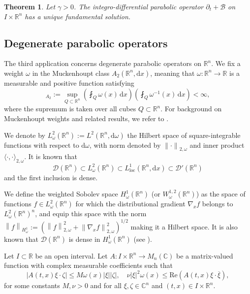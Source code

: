 \documentclass[11pt, letterpaper]{amsart}
\newtheorem{thm}{Theorem}[section]
\theoremstyle{definition}
\theoremstyle{remark}
\numberwithin{equation}{section}
\begin{document}
\begin{thm} Let $\gamma>0$.  
    The integro-differential parabolic  operator $\partial_t+ \mathcal{B}$ on $I\times \mathbb{R}^n$  has a unique fundamental solution.
\end{thm}


\subsection{Degenerate parabolic operators}
The third application concerns degenerate parabolic operators on $\mathbb{R}^n$. We fix a weight $\omega$ in the Muckenhoupt class $A_2(\mathbb{R}^n, \mathrm{d}x)$, meaning that $\omega: \mathbb{R}^n \to \mathbb{R}$ is a measurable and positive function satisfying
\begin{equation*}
     [ \omega  ]_{A_2}:= \sup_{Q \subset \mathbb{R}^n  } \left ( \fint_Q\omega(x)\,\mathrm{d} x   \right ) \left ( \fint_Q\omega^{-1}(x)\,\mathrm{d} x   \right ) < \infty,
\end{equation*}
where the supremum is taken over all cubes $Q \subset \mathbb{R}^n$. For background on Muckenhoupt weights and related results, we refer to \cite[Ch. V]{Stein1993_HA}.

We denote by $L^2_\omega(\mathbb{R}^n) := L^2(\mathbb{R}^n, \mathrm{d}\omega)$ the Hilbert space of square-integrable functions with respect to $\mathrm{d}\omega$, with norm denoted by ${\lVert \cdot \rVert}_{2,\omega}$ and inner product $\langle \cdot , \cdot \rangle_{2,\omega}$. It is known that $$\mathcal{D}(\mathbb{R}^n)  
\subset L^2_\omega(\mathbb{R}^n) \subset L^1_{\text{loc}}(\mathbb{R}^n, \mathrm{d}x) \subset \mathcal{D}'(\mathbb{R}^n)$$ and the first inclusion is dense.

We define the weighted Sobolev space $H^1_{\omega}(\mathbb{R}^n)$ (or $W^{1,2}_\omega(\mathbb{R}^n)$) as the space of functions $f \in L^2_\omega(\mathbb{R}^n)$ for which the distributional gradient $\nabla_x f$ belongs to $L^2_\omega(\mathbb{R}^n)^n$, and equip this space with the norm $\left\| f \right\|_{H^1_\omega} := ( \left\| f \right\|_{2,\omega}^2 + \left\| \nabla_x f \right\|_{2,\omega}^2 )^{1/2}$ making it a Hilbert space. It is also known that  $\mathcal{D}(\mathbb{R}^n)$ is dense in $H^1_{\omega}(\mathbb{R}^n)$ (see \cite[Thm. 2.5]{kilpelainen1994weighted}).

Let $I \subset \mathbb{R}$ be an open interval. Let $A: I \times \mathbb{R}^n \to M_n(\mathbb{C})$ be a matrix-valued function with complex measurable coefficients such that
$$
\left| A(t,x) \xi \cdot \zeta \right| \leq M \omega(x) \left| \xi \right| \left| \zeta \right|, \quad \nu \left| \xi \right|^2 \omega(x) \leq \mathrm{Re}(A(t,x) \xi \cdot \overline{\xi}),
$$
for some constants $M, \nu > 0$ and for all $\xi, \zeta \in \mathbb{C}^n$ and $(t,x) \in I \times \mathbb{R}^n$.
\end{document}
